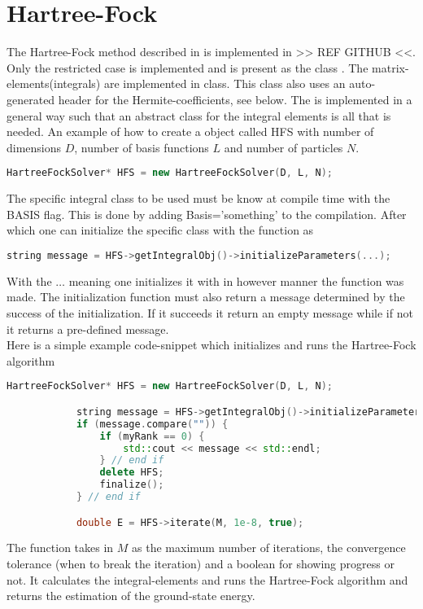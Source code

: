 \section{Hartree-Fock}
    The Hartree-Fock method described in  is implemented in
    >> REF GITHUB <<. Only the restricted case is implemented and is present as
    the class . The matrix-elements(integrals) are
    implemented in  class. This class also uses an
    auto-generated header for the Hermite-coefficients, see
     below. The  is
    implemented in a general way such that an abstract class for the integral
    elements is all that is needed. An example of how to create a
     object called HFS with number of dimensions
    $D$, number of basis functions $L$ and number of particles $N$.
        \begin{lstlisting}[language=C++, style=ccstyle]
            HartreeFockSolver* HFS = new HartreeFockSolver(D, L, N);
        \end{lstlisting}
    The specific integral class to be used must be know at compile time with
    the BASIS flag. This is done by adding Basis='something' to the
    compilation. After which one can initialize the specific class with the
     function as
        \begin{lstlisting}[language=C++, style=ccstyle]
            string message = HFS->getIntegralObj()->initializeParameters(...);
        \end{lstlisting}
    With the $\dots$ meaning one initializes it with in however manner the
    function was made. The initialization function must also return a message
    determined by the success of the initialization. If it succeeds it return
    an empty message while if not it returns a pre-defined message. \\ Here is
    a simple example code-snippet which initializes and runs the Hartree-Fock
    algorithm
        \begin{lstlisting}[language=C++, style=ccstyle]
            HartreeFockSolver* HFS = new HartreeFockSolver(D, L, N);

            string message = HFS->getIntegralObj()->initializeParameters(...);
            if (message.compare("")) {
                if (myRank == 0) {
                    std::cout << message << std::endl;
                } // end if
                delete HFS;
                finalize();
            } // end if

            double E = HFS->iterate(M, 1e-8, true);
        \end{lstlisting}
    The  function takes in $M$ as the maximum number of
    iterations, the convergence tolerance (when to break the iteration) and a
    boolean for showing progress or not. It calculates the integral-elements
    and runs the Hartree-Fock algorithm and returns the estimation of the
    ground-state energy.
